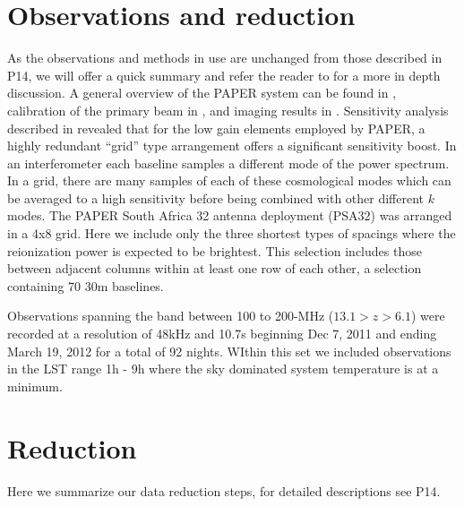 \documentclass[preprint]{aastex}
\begin{document}
%



\section{Observations and reduction}
\label{sec:observations}
As the observations and methods in use are unchanged from those described in P14, we will offer a quick summary and refer the reader to \cite{Parsons:2013p9876} for a more in depth discussion.  A general overview of the PAPER system can be found in \cite{Parsons:2010p6757}, calibration of the primary beam in \cite{Pober:2012p8800}, and imaging results in \cite{Jacobs:2011p8438,Jacobs:2013p10014,Stefan:2013p9926}.  Sensitivity analysis described in \cite{Parsons:2012p9028} revealed that for the low gain elements employed by PAPER, a highly redundant ``grid'' type arrangement offers a significant sensitivity boost.  In an interferometer each baseline samples a different mode of the power spectrum.  In a grid, there are many samples of each of these cosmological modes which can be averaged to a high sensitivity before being combined with other different $k$ modes.  The PAPER South Africa 32 antenna deployment (PSA32) was arranged in a 4x8 grid.  Here we include only the three shortest types of spacings where the reionization power is expected to be brightest. This selection includes those between adjacent columns within at least one row of each other, a selection containing 70 30m baselines.

Observations spanning the band between 100 to 200-MHz ($13.1>z>6.1$) were recorded at a resolution of 48kHz and 10.7s  beginning Dec 7, 2011 and ending March 19, 2012 for a total of 92 nights.  WIthin this set we included observations in the LST range 1h - 9h where the sky dominated system temperature is at a minimum.  




\section{Reduction}
\label{sec:obs_meth}
Here we summarize our data reduction steps, for detailed descriptions see P14.
\end{document}

